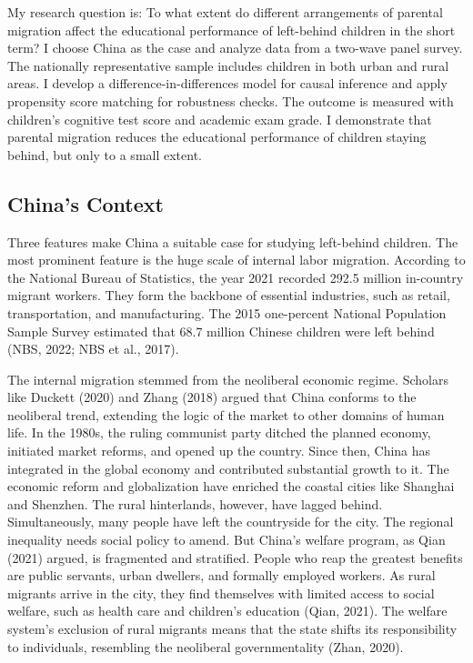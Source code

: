 \documentclass[
  man,floatsintext]{apa7}
\begin{document}
My research question is: To what extent do different arrangements of parental migration affect the educational performance of left-behind children in the short term? I choose China as the case and analyze data from a two-wave panel survey. The nationally representative sample includes children in both urban and rural areas. I develop a difference-in-differences model for causal inference and apply propensity score matching for robustness checks. The outcome is measured with children's cognitive test score and academic exam grade. I demonstrate that parental migration reduces the educational performance of children staying behind, but only to a small extent.

\hypertarget{chinas-context}{%
\subsection{China's Context}\label{chinas-context}}

Three features make China a suitable case for studying left-behind children. The most prominent feature is the huge scale of internal labor migration. According to the National Bureau of Statistics, the year 2021 recorded 292.5 million in-country migrant workers. They form the backbone of essential industries, such as retail, transportation, and manufacturing. The 2015 one-percent National Population Sample Survey estimated that 68.7 million Chinese children were left behind (NBS, 2022; NBS et al., 2017).

The internal migration stemmed from the neoliberal economic regime. Scholars like Duckett (2020) and Zhang (2018) argued that China conforms to the neoliberal trend, extending the logic of the market to other domains of human life. In the 1980s, the ruling communist party ditched the planned economy, initiated market reforms, and opened up the country. Since then, China has integrated in the global economy and contributed substantial growth to it. The economic reform and globalization have enriched the coastal cities like Shanghai and Shenzhen. The rural hinterlands, however, have lagged behind. Simultaneously, many people have left the countryside for the city. The regional inequality needs social policy to amend. But China's welfare program, as Qian (2021) argued, is fragmented and stratified. People who reap the greatest benefits are public servants, urban dwellers, and formally employed workers. As rural migrants arrive in the city, they find themselves with limited access to social welfare, such as health care and children's education (Qian, 2021). The welfare system's exclusion of rural migrants means that the state shifts its responsibility to individuals, resembling the neoliberal governmentality (Zhan, 2020).
\end{document}
